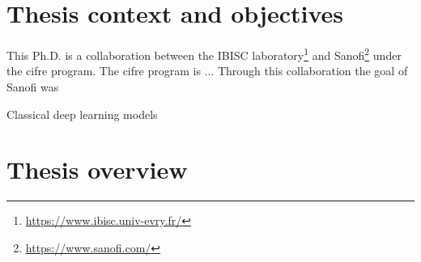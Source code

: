 \documentclass[../main.tex]{subfiles}
\begin{document}
\section{Thesis context and objectives}
 This Ph.D. is a collaboration between the IBISC laboratory\footnote{\url{https://www.ibisc.univ-evry.fr/}} and Sanofi\footnote{\url{https://www.sanofi.com/}} under the \gls{cifre} program.
 The \gls{cifre} program is ... 
 Through this collaboration the goal of Sanofi was 

 \begin{description}[
		 style=multiline,
		 leftmargin=!,
		 labelwidth=\eqboxwidth{listlabel@\EnumitemId}, format=\mylabelformat
	 ]
	 \item[First objective] Classical deep learning models
	 \item[Second objective]
	 \item[Third objective]
 \end{description}



 \clearpage
\section{Thesis overview}
 \begin{center}
	 \ifSubfilesClassLoaded{%
	 }{
	 }
 \end{center}

\end{document}
